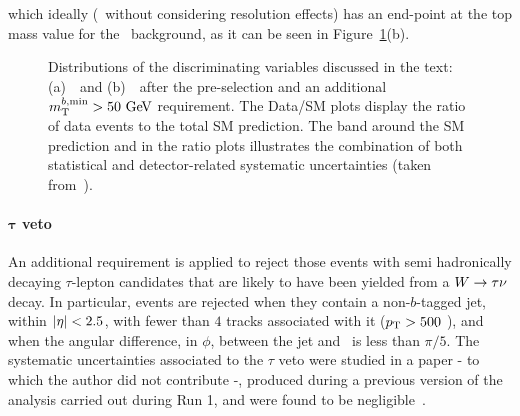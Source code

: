 				\noindent which ideally (\ie\ without considering resolution effects) has an end-point at the top mass value for the \ttbar\ background, as it can be seen in Figure~\ref{fig:preselection}(b).
				\begin{figure}[!htb]
				  \begin{center}
					  \caption{Distributions of the discriminating variables discussed in the text: (a)~\mantikttwelvezero\ and (b)~\mtbmin\ after the pre-selection and an additional $\mtbmin>50\gev$ requirement. The Data/\ac{SM} plots display the ratio of data events to the total \ac{SM} prediction. The band around the \ac{SM} prediction and in the ratio plots illustrates the combination of both statistical and detector-related systematic uncertainties (taken from~\cite{stop0L}).}
					  \label{fig:preselection}
				  \end{center}
				\end{figure}

			\paragraph{$\mathbf{\tau}$ veto}

				An additional requirement is applied to reject those events with semi hadronically decaying $\tau$-lepton candidates that are likely to have been yielded from a $W\rightarrow\tau\nu$ decay. In particular, events are rejected when they contain a non-$b$-tagged jet, within $|\eta| < 2.5$, with fewer than $4$ tracks associated with it ($p_{\mathrm{T}} > 500$ \MeV), and when the angular difference, in $\phi$, between the jet and \ptmiss\ is less than $\pi/5$. The systematic uncertainties associated to the $\tau$ veto were studied in a paper - to which the author did not contribute -, produced during a previous version of the analysis carried out during Run 1, and were found to be negligible~\cite{stop0LRun1}.



